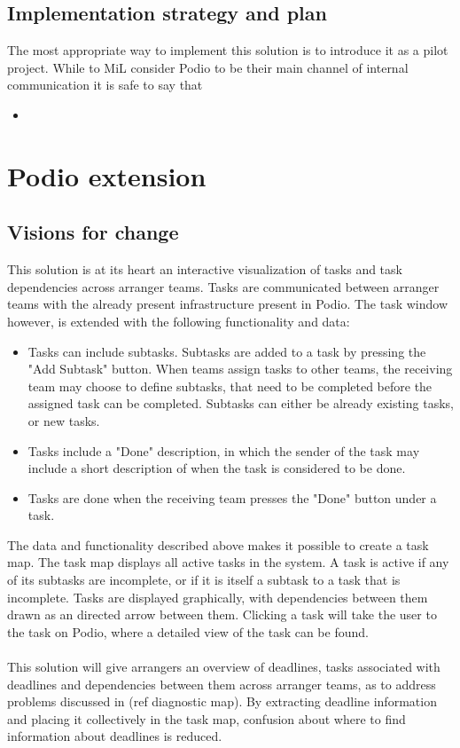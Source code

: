 \subsection{Implementation strategy and plan} 
The most appropriate way to implement this solution is to introduce it as a pilot project. While to MiL consider Podio to be their main channel of internal communication it is safe to say that 

\begin{itemize}
    \item 
\end{itemize}

\section{Podio extension}
\subsection{Visions for change}
\label{visions_for_change}
This solution is at its heart an interactive visualization of tasks and task dependencies across arranger teams. Tasks are communicated between arranger teams with the already present infrastructure present in Podio. The task window however, is extended with the following functionality and data:
\begin{itemize}
    \item Tasks can include subtasks. Subtasks are added to a task by pressing the "Add Subtask" button. When teams assign tasks to other teams, the receiving team may choose to define subtasks, that need to be completed before the assigned task can be completed. Subtasks can either be already existing tasks, or new tasks.
    \item Tasks include a "Done" description, in which the sender of the task may include a short description of when the task is considered to be done.
    \item Tasks are done when the receiving team presses the "Done" button under a task.
\end{itemize}
The data and functionality described above makes it possible to create a task map. The task map displays all active tasks in the system. A task is active if any of its subtasks are incomplete, or if it is itself a subtask to a task that is incomplete. Tasks are displayed graphically, with dependencies between them drawn as an directed arrow between them. Clicking a task will take the user to the task on Podio, where a detailed view of the task can be found. 
\\ \\
This solution will give arrangers an overview of deadlines, tasks associated with deadlines and dependencies between them across arranger teams, as to address problems discussed in (ref diagnostic map). By extracting deadline information and placing it collectively in the task map, confusion about where to find information about deadlines is reduced.



